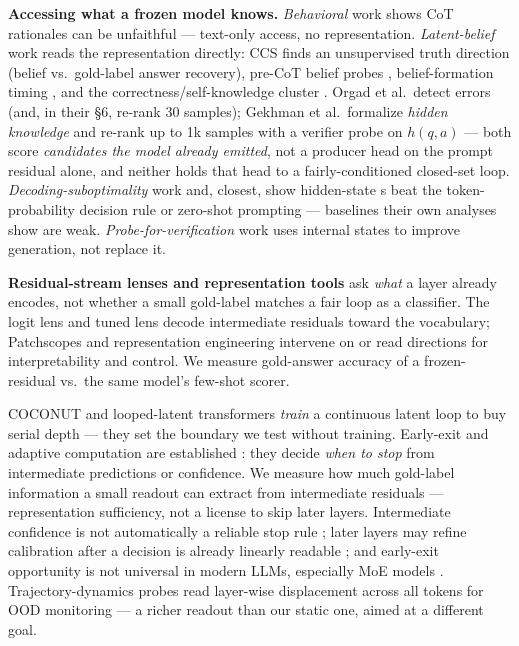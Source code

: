 \textbf{Accessing what a frozen model knows.} \emph{Behavioral} work
\citep{turpin2023unfaithful} shows CoT rationales can be unfaithful ---
text-only access, no representation. \emph{Latent-belief} work reads the
representation directly: CCS \citep{burns2022ccs} finds an unsupervised
truth direction (belief vs.\ gold-label answer recovery), pre-CoT belief
probes \citep{cox2026precommitted}, belief-formation timing
\citep{boppana2026theater}, and the correctness/self-knowledge cluster
\citep{kadavath2022know,orgad2025know,gekhman2025insideout,cencerrado2026noanswer}.
Orgad et al.\ detect errors (and, in their \S6, re-rank 30 samples); Gekhman
et al.\ formalize \emph{hidden knowledge} and re-rank up to 1k samples with a
verifier probe on $h(q,a)$ --- both score \emph{candidates the model already
emitted}, not a producer head on the prompt residual alone, and neither holds
that head to a fairly-conditioned closed-set loop.
\emph{Decoding-suboptimality} work
\citep{cho2025hidden,buckmann2024logistic,abbas2024linc,cho2023palp} and,
closest, \citet{hazenoot2026esg} show hidden-state \head{}s beat the
token-probability decision rule or zero-shot prompting --- baselines their own
analyses show are weak. \emph{Probe-for-verification} work
\citep{ni2026reprobe} uses internal states to improve generation, not replace
it.

\textbf{Residual-stream lenses and representation tools} ask \emph{what} a
layer already encodes, not whether a small gold-label \head{} matches a fair
loop as a classifier. The logit lens \citep{nostalgebraist2020logitlens} and
tuned lens \citep{belrose2023tunedlens} decode intermediate residuals toward
the vocabulary; Patchscopes \citep{ghandeharioun2024patchscopes} and
representation engineering \citep{zou2023repeng} intervene on or read
directions for interpretability and control. We measure gold-answer accuracy
of a frozen-residual \head{} vs.\ the same model's few-shot scorer.

COCONUT \citep{hao2024coconut} and looped-latent transformers
\citep{saunshi2025looped} \emph{train} a continuous latent loop to buy serial
depth --- they set the boundary we test without training. Early-exit and
adaptive computation are established
\citep{xin2020deebert,zhou2020pabee,schuster2021cat,schuster2022calm,elhoushi2024layerskip,chen2023eellm,fan2025adainfer,wei2025adadecode}:
they decide \emph{when to stop} from intermediate predictions or confidence.
We measure how much gold-label information a small readout can extract from
intermediate residuals --- representation sufficiency, not a license to skip
later layers. Intermediate confidence is not automatically a reliable stop
rule \citep{zhou2020pabee,wen2026specbound}; later layers may refine
calibration after a decision is already linearly readable
\citep{joshi2025calibration}; and early-exit opportunity is not universal in
modern LLMs, especially MoE models \citep{wei2026diminishing}.
Trajectory-dynamics probes \citep{damirchi2026tat} read layer-wise
displacement across all tokens for OOD monitoring --- a richer readout than
our static one, aimed at a different goal.

